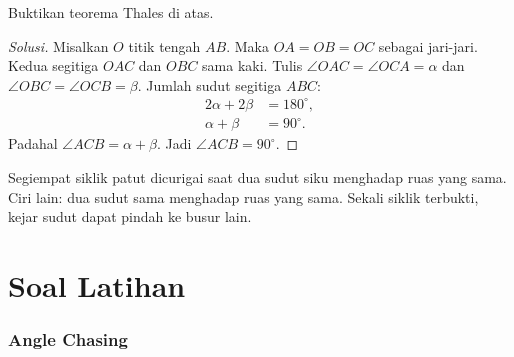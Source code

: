 \documentclass[12pt]{scrartcl}
\begin{document}
\begin{example}
Buktikan teorema Thales di atas.
\begin{center}
\end{center}
\end{example}
\begin{proof}[Solusi]
Misalkan $O$ titik tengah $AB$. Maka $OA = OB = OC$ sebagai jari-jari.
Kedua segitiga $OAC$ dan $OBC$ sama kaki. Tulis
$\angle OAC = \angle OCA = \alpha$ dan
$\angle OBC = \angle OCB = \beta$. Jumlah sudut segitiga $ABC$:
\begin{align*}
2\alpha + 2\beta &= 180^\circ, \\
\alpha + \beta &= 90^\circ.
\end{align*}
Padahal $\angle ACB = \alpha + \beta$. Jadi $\angle ACB = 90^\circ$.
\end{proof}

\begin{remark}
Segiempat siklik patut dicurigai saat dua sudut siku menghadap ruas yang
sama. Ciri lain: dua sudut sama menghadap ruas yang sama. Sekali siklik
terbukti, kejar sudut dapat pindah ke busur lain.
\end{remark}

\part*{Soal Latihan}

\section{Angle Chasing}
\end{document}
